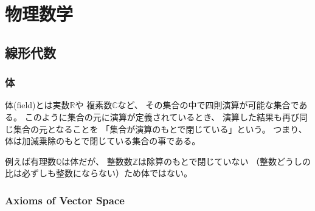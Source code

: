 \appendix
\renewcommand{\theequation}{\Alph{section}.\arabic{subsection}.\arabic{equation}}
\setcounter{equation}{0}

\section{物理数学}

\subsection{線形代数}

\subsubsection{体}

体(field)とは実数$\mathbb{R}$や
複素数$\mathbb{C}$など、
その集合の中で四則演算が可能な集合である。
このように集合の元に演算が定義されているとき、
演算した結果も再び同じ集合の元となることを
「集合が演算のもとで閉じている」という。
つまり、体は加減乗除のもとで閉じている集合の事である。

例えば有理数$\mathbb{Q}$は体だが、
整数数$\mathbb{Z}$は除算のもとで閉じていない
（整数どうしの比は必ずしも整数にならない）ため体ではない。

\subsubsection{Axioms of Vector Space}
\label{Axioms of Vector Space}

